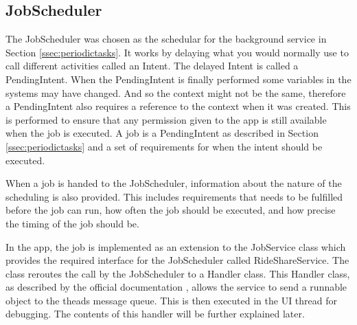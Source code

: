 \subsection{JobScheduler}
The JobScheduler was chosen as the schedular for the background service in Section \ref{ssec:periodictasks}.
It works by delaying what you would normally use to call different activities called an Intent.
The delayed Intent is called a PendingIntent.
When the PendingIntent is finally performed some variables in the systems may have changed.
And so the context might not be the same, therefore a PendingIntent also requires a reference to the context when it was created.
This is performed to ensure that any permission given to the app is still available when the job is executed.
A job is a PendingIntent as described in Section \ref{ssec:periodictasks} and a set of requirements for when the intent should be executed.

When a job is handed to the JobScheduler, information about the nature of the scheduling is also provided.
This includes requirements that needs to be fulfilled before the job can run, how often the job should be executed, and how precise the timing of the job should be.


In the app, the job is implemented as an extension to the JobService class which provides the required interface for the JobScheduler called RideShareService.
The class reroutes the call by the JobScheduler to a Handler class.
This Handler class, as described by the official documentation \cite{handler}, allows the service to send a runnable object to the theads message queue.
This is then executed in the UI thread for debugging.
The contents of this handler will be further explained later. 
